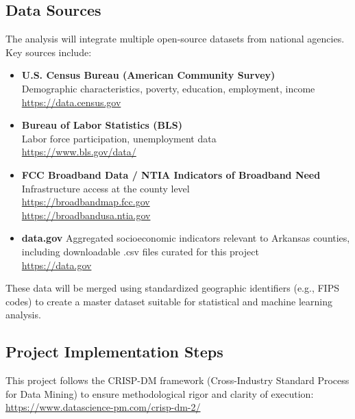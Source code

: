 \documentclass[12pt]{llncs}
\begin{document}
\subsection{Data Sources}
The analysis will integrate multiple open-source datasets from national agencies. Key sources include:

\begin{itemize}
    \item \textbf{U.S. Census Bureau (American Community Survey)} \\
    Demographic characteristics, poverty, education, employment, income \\
    \href{https://data.census.gov}{https://data.census.gov}

    \item \textbf{Bureau of Labor Statistics (BLS)} \\
    Labor force participation, unemployment data \\
    \href{https://www.bls.gov/data/}{https://www.bls.gov/data/}

    \item \textbf{FCC Broadband Data / NTIA Indicators of Broadband Need} \\
    Infrastructure access at the county level \\
    \href{https://broadbandmap.fcc.gov}{https://broadbandmap.fcc.gov} \\
    \href{https://broadbandusa.ntia.gov}{https://broadbandusa.ntia.gov}

    \item \textbf{data.gov}
    Aggregated socioeconomic indicators relevant to Arkansas counties, including downloadable .csv files curated for this project\\
    \href{ https://data.gov}{ https://data.gov}
    
\end{itemize}

These data will be merged using standardized geographic identifiers (e.g., FIPS codes) to create a master dataset suitable for statistical and machine learning analysis.

\subsection{Project Implementation Steps}

This project follows the CRISP-DM framework (Cross-Industry Standard Process for Data Mining) to ensure methodological rigor and clarity of execution:
\href{https://www.datascience-pm.com/crisp-dm-2/}{https://www.datascience-pm.com/crisp-dm-2/}
\end{document}
